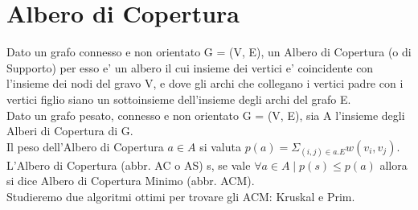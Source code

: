 \chapter{Albero di Copertura}

Dato un grafo connesso e non orientato G = (V, E), un Albero di Copertura (o di Supporto) per esso e' un albero il cui insieme dei vertici e' coincidente con l'insieme dei nodi del gravo V, e dove gli archi che collegano i vertici padre con i vertici figlio siano un sottoinsieme dell'insieme degli archi del grafo E. \\
Dato un grafo pesato, connesso e non orientato G = (V, E), sia A l'insieme degli Alberi di Copertura di G. \\
Il peso dell'Albero di Copertura $a \in A$ si valuta $p(a) = \Sigma_{(i,j) \in a.E} w(v_i,v_j)$. \\
L'Albero di Copertura (abbr. AC o AS) s, se vale $\forall a \in A \mid p(s) \leq p(a)$ allora si dice Albero di Copertura Minimo (abbr. ACM). \\
Studieremo due algoritmi ottimi per trovare gli ACM: Kruskal e Prim.
